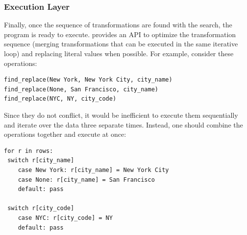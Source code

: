 \subsubsection{Execution Layer} Finally, once the sequence of transformations are found with the search, the program is ready to execute. \sys provides an API to optimize the transformation sequence (merging transformations that can be executed in the same iterative loop) and replacing literal values when possible. 
For example, consider these operations:
\begin{lstlisting}
find_replace(New York, New York City, city_name)
find_replace(None, San Francisco, city_name)
find_replace(NYC, NY, city_code)
\end{lstlisting}
Since they do not conflict, it would be inefficient to execute them sequentially and iterate over the data three separate times.
Instead, one should combine the operations together and execute at once:
\begin{lstlisting}
for r in rows:
 switch r[city_name]
    case New York: r[city_name] = New York City
    case None: r[city_name] = San Francisco
    default: pass
    
 switch r[city_code]
    case NYC: r[city_code] = NY
    default: pass
\end{lstlisting}

